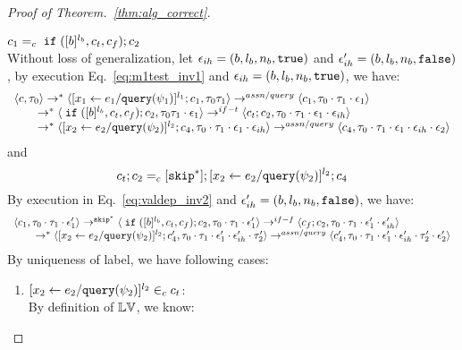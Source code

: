 \begin{proof}[Proof of Theorem.~\ref{thm:alg_correct}]
\begin{case}
\begin{subcase}
\begin{subsubcase}
\begin{subsubsubcase}
\begin{subproof}
%
$c_1 =_c \;\mathtt{if}\; ([b]^{l_b}, c_t, c_f);{c}_2$ 
\\
Without loss of generalization, 
let $\mathtt{\epsilon}_{ih} = (b, l_b, n_b, \mathtt{true})$ and
$\mathtt{\epsilon}_{ih}' = (b, l_b, n_b, \mathtt{false})$,
by execution Eq.~\ref{eq:m1test_inv1} and $\mathtt{\epsilon}_{ih} = (b, l_b, n_b, \mathtt{true})$, we have:
\[
  \begin{array}{l}   
  \langle {c}, \mathtt{\tau}_0 \rangle \rightarrow^{*} 
  \langle [\mathrel{ {x}_1 \leftarrow e_1 / {\tt query}(\psi_1) }]^{l_1} ; {c}_1, \mathtt{\tau}_0 \mathtt{\tau}_1 \rangle  
  \rightarrow^{assn/query}
  \langle c_1, \mathtt{\tau}_0 \cdot \mathtt{\tau}_1 \cdot \mathtt{\epsilon}_1 \rangle 
  \\
  \qquad \rightarrow^{*} 
  \langle \;\mathtt{if}\; ([b]^{l_b}, c_t, c_f);{c}_2, \mathtt{\tau}_0 \mathtt{\tau}_1 \cdot \mathtt{\epsilon}_1 \rangle 
  \rightarrow^{if-t} 
  \langle c_t;c_2, \mathtt{\tau}_0 \cdot \mathtt{\tau}_1 \cdot \mathtt{\epsilon}_1 \cdot \mathtt{\epsilon}_{ih} \rangle 
  \\
  \qquad \rightarrow^{*} 
  \langle [\mathrel{ {x}_2 \leftarrow e_2 / {\tt query}(\psi_2) }]^{l_2};{c}_4, 
  \mathtt{\tau}_0 \cdot \mathtt{\tau}_1 \cdot \mathtt{\epsilon}_1 \cdot \mathtt{\epsilon}_{ih} \rangle 
  \rightarrow^{assn/query} 
  \langle {c}_4,  \mathtt{\tau}_0 \cdot \mathtt{\tau}_1 \cdot \mathtt{\epsilon}_1 \cdot \mathtt{\epsilon}_{ih} \cdot \mathtt{\epsilon}_2 \rangle 
  \end{array}
\]
and 
\[
  c_t;c_2 =_c [\mathtt{skip}^*]; [\mathrel{ {x}_2 \leftarrow e_2 / {\tt query}(\psi_2) }]^{l_2};{c}_4
\]
%
By execution in Eq.~\ref{eq:valdep_inv2} and $\mathtt{\epsilon}_{ih}' = (b, l_b, n_b, \mathtt{false})$, we have:
\begin{equation}
\label{eq:m1testif_inv2}
  \begin{array}{l}   
  \langle c_1, \mathtt{\tau}_0 \cdot \mathtt{\tau}_1 \cdot \mathtt{\epsilon}_1' \rangle 
  \rightarrow^{\mathtt{skip}^*} 
  \langle \;\mathtt{if}\; ([b]^{l_b}, c_t, c_f); {c}_2, \mathtt{\tau}_0 \cdot \mathtt{\tau}_1 \cdot \mathtt{\epsilon}_1' \rangle 
  \rightarrow^{if-f} 
  \langle c_f;c_2, \mathtt{\tau}_0 \cdot \mathtt{\tau}_1 \cdot \mathtt{\epsilon}_1' \cdot \mathtt{\epsilon}_{ih}' \rangle 
  \\
  \qquad \rightarrow^{*} 
  \langle [\mathrel{ {x}_2 \leftarrow e_2 / {\tt query}(\psi_2) }]^{l_2};{c}_4', 
  \mathtt{\tau}_0 \cdot \mathtt{\tau}_1 \cdot \mathtt{\epsilon}_1' \cdot \mathtt{\epsilon}_{ih}' \cdot \mathtt{\tau}_2' \rangle
  \rightarrow^{assn/query} 
  \langle {c}_4',  \mathtt{\tau}_0 \cdot \mathtt{\tau}_1 \cdot \mathtt{\epsilon}_1' \cdot \mathtt{\epsilon}_{ih}' \cdot \mathtt{\tau}_2' \cdot \mathtt{\epsilon}_2' \rangle 
\end{array}
\end{equation}
%
 By uniqueness of label, we have following cases:
 \begin{enumerate}
 \item $[\mathrel{ {x}_2 \leftarrow e_2 / {\tt query}(\psi_2) }]^{l_2} \in_c c_t$:
\\
By definition of $\mathbb{LV}$, we know:

\end{enumerate}
\end{subproof}
\end{subsubsubcase}
\end{subsubcase}
\end{subcase}
\end{case}
\end{proof}
